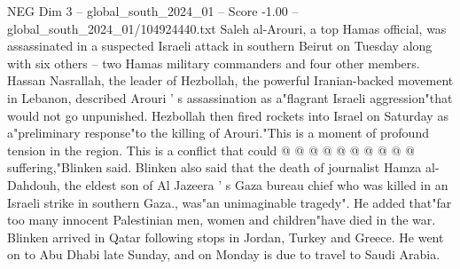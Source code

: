 \begin{textsample}{NEG Dim 3 – global\_south\_2024\_01 – Score -1.00 – global\_south\_2024\_01/104924440.txt}
Saleh al-Arouri, a top Hamas official, was assassinated in a suspected Israeli attack in southern Beirut on Tuesday along with six others -- two Hamas military commanders and four other members.
Hassan Nasrallah, the leader of Hezbollah, the powerful Iranian-backed movement in Lebanon, described Arouri ' s assassination as a"flagrant Israeli aggression"that would not go unpunished.
Hezbollah then fired rockets into Israel on Saturday as a"preliminary response"to the killing of Arouri."This is a moment of profound tension in the region.
This is a conflict that could @ @ @ @ @ @ @ @ @ @ suffering,"Blinken said.
Blinken also said that the death of journalist Hamza al-Dahdouh, the eldest son of Al Jazeera ' s Gaza bureau chief who was killed in an Israeli strike in southern Gaza., was"an unimaginable tragedy".
He added that"far too many innocent Palestinian men, women and children"have died in the war.
Blinken arrived in Qatar following stops in Jordan, Turkey and Greece.
He went on to Abu Dhabi late Sunday, and on Monday is due to travel to Saudi Arabia.

\end{textsample}

